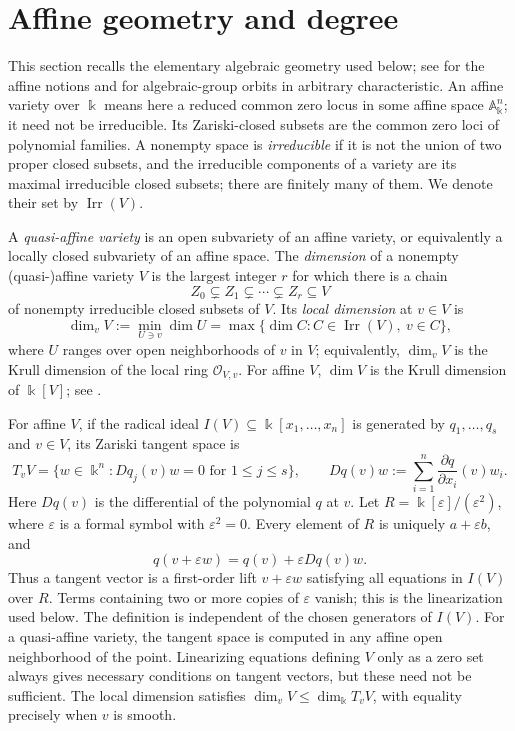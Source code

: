 \documentclass[11pt]{amsart}
\theoremstyle{definition}
\theoremstyle{remark}
\newcommand{\kk}{\Bbbk}
\DeclareMathOperator{\Irr}{Irr}
\begin{document}
\section{Affine geometry and degree}\label{sec:geometry}

This section recalls the elementary algebraic geometry used below; see
\cite[Chapters~1--4 and 9]{CoxLittleOShea} for the affine notions and
\cite[Proposition~1.8]{Borel} for algebraic-group orbits in arbitrary
characteristic.  An affine variety over
$\kk$ means here a reduced common zero locus in some affine space
$\mathbb A^n_{\kk}$; it need not be irreducible.  Its Zariski-closed subsets
are the common zero loci of polynomial families.  A nonempty space is
\emph{irreducible} if it is not the union of two proper closed subsets, and
the irreducible components of a variety are its maximal irreducible closed
subsets; there are finitely many of them.  We denote their set by
$\Irr(V)$.

A \emph{quasi-affine variety} is an open subvariety of an affine variety,
or equivalently a locally closed subvariety of an affine space.  The
\emph{dimension} of a nonempty (quasi-)affine variety $V$ is the largest
integer $r$ for which there is a chain
\[
 Z_0\subsetneq Z_1\subsetneq\cdots\subsetneq Z_r\subseteq V
\]
of nonempty irreducible closed subsets of $V$.  Its \emph{local dimension}
at $v\in V$ is
\[
 \dim_vV:=\min_{U\ni v}\dim U
   =\max\{\dim C:C\in\Irr(V),\ v\in C\},
\]
where $U$ ranges over open neighborhoods of $v$ in $V$; equivalently,
$\dim_vV$ is the Krull dimension of the local ring $\mathcal O_{V,v}$.
For affine $V$, $\dim V$ is the Krull dimension of $\kk[V]$; see
\cite[AG, \S\S{}1.4, 3.8, and 9.1]{Borel}.

For affine $V$, if the radical ideal $I(V)\subseteq\kk[x_1,\ldots,x_n]$ is generated by
$q_1,\ldots,q_s$ and $v\in V$, its Zariski tangent space is
\[
 T_vV=\{w\in\kk^n:Dq_j(v)w=0\text{ for }1\leq j\leq s\},
 \qquad
 Dq(v)w:=\sum_{i=1}^n\frac{\partial q}{\partial x_i}(v)w_i.
\]
Here $Dq(v)$ is the differential of the polynomial $q$ at $v$.
Let $R=\kk[\varepsilon]/(\varepsilon^2)$, where $\varepsilon$ is a formal
symbol with $\varepsilon^2=0$.  Every element of $R$ is uniquely
$a+\varepsilon b$, and
\[
 q(v+\varepsilon w)=q(v)+\varepsilon Dq(v)w.
\]
Thus a tangent vector is a first-order lift $v+\varepsilon w$ satisfying
all equations in $I(V)$ over $R$.  Terms containing two or more copies of
$\varepsilon$ vanish; this is the linearization used below.
The definition is independent of the chosen generators of $I(V)$.
For a quasi-affine variety, the tangent space is computed in any affine
open neighborhood of the point.
Linearizing equations defining $V$ only as a zero set always gives
necessary conditions on tangent vectors, but these need not be sufficient.
The local dimension satisfies $\dim_vV\leq\dim_{\kk}T_vV$, with equality
precisely when $v$ is smooth.
\end{document}
